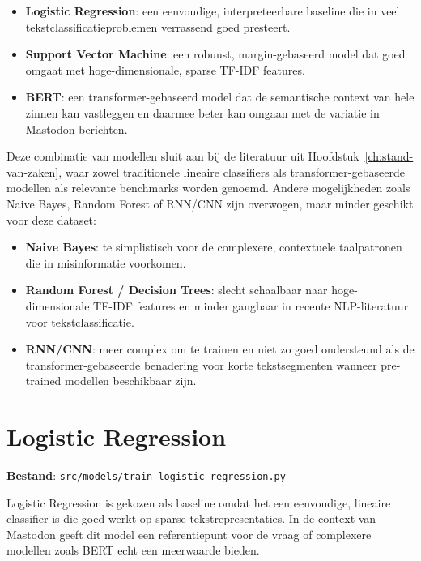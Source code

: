 \begin{itemize}
    \item \textbf{Logistic Regression}: een eenvoudige, interpreteerbare baseline
          die in veel tekstclassificatieproblemen verrassend goed presteert.
    \item \textbf{Support Vector Machine}: een robuust, margin-gebaseerd model dat
          goed omgaat met hoge-dimensionale, sparse TF-IDF features.
    \item \textbf{BERT}: een transformer-gebaseerd model dat de semantische
          context van hele zinnen kan vastleggen en daarmee beter kan omgaan met
          de variatie in Mastodon-berichten.
\end{itemize}

Deze combinatie van modellen sluit aan bij de literatuur uit
Hoofdstuk~\ref{ch:stand-van-zaken}, waar zowel traditionele lineaire
classifiers als transformer-gebaseerde modellen als relevante benchmarks
worden genoemd. Andere mogelijkheden zoals Naive Bayes, Random Forest of
RNN/CNN zijn overwogen, maar minder geschikt voor deze dataset:

\begin{itemize}
    \item \textbf{Naive Bayes}: te simplistisch voor de complexere,
          contextuele taalpatronen die in misinformatie voorkomen.
    \item \textbf{Random Forest / Decision Trees}: slecht schaalbaar naar
          hoge-dimensionale TF-IDF features en minder gangbaar in recente
          NLP-literatuur voor tekstclassificatie.
    \item \textbf{RNN/CNN}: meer complex om te trainen en niet zo goed
          ondersteund als de transformer-gebaseerde benadering voor korte
          tekstsegmenten wanneer pre-trained modellen beschikbaar zijn.
\end{itemize}

\section{Logistic Regression}

\textbf{Bestand}: \texttt{src/models/train\_logistic\_regression.py}

Logistic Regression is gekozen als baseline omdat het een eenvoudige,
lineaire classifier is die goed werkt op sparse tekstrepresentaties. In de
context van Mastodon geeft dit model een referentiepunt voor de vraag of
complexere modellen zoals BERT echt een meerwaarde bieden.

